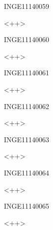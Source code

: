 \documentclass{article}
\begin{document}
\begin{corrige}{INGE11140059}

<++>

\end{corrige}%


\begin{corrige}{INGE11140060}

<++>

\end{corrige}%


\begin{corrige}{INGE11140061}

<++>

\end{corrige}%


\begin{corrige}{INGE11140062}

<++>

\end{corrige}%


\begin{corrige}{INGE11140063}

<++>

\end{corrige}%


\begin{corrige}{INGE11140064}

<++>

\end{corrige}%


\begin{corrige}{INGE11140065}

<++>

\end{corrige}%
\end{document}
